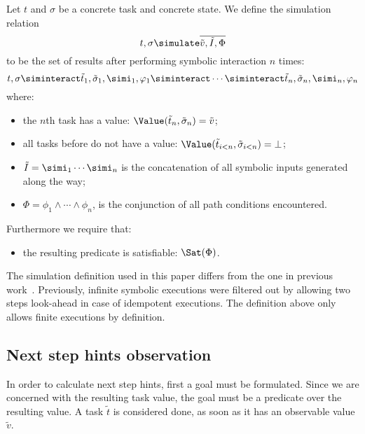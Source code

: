 \begin{definition}[Simulation]
  Let $t$ and $\sigma$ be a concrete task and concrete state.
  We define the simulation relation
  \begin{equation*}
    t,\sigma \simulate \overline{\tilde{v},\tilde{I},\Phi}
  \end{equation*}
  to be the set of results after performing symbolic interaction $n$ times:
  \begin{equation*}
      t,\sigma
        \siminteract \tilde{t}_1,\tilde{\sigma}_1,\simi_1,\phi_1
        \siminteract \cdots
        \siminteract \tilde{t}_n,\tilde{\sigma}_n,\simi_n,\phi_n
  \end{equation*}
  where:
  \begin{itemize}
    \item the $n$th task has a value: $\Value(\tilde{t}_n,\tilde{\sigma}_n) = \tilde{v}$;
    \item all tasks before do not have a value: $\Value(\tilde{t}_{i<n},\tilde{\sigma}_{i<n}) = \bot$;
    \item $\tilde{I} = \simi_1 \cdots \simi_n$ is the concatenation of all symbolic inputs generated along the way;
    \item $\Phi = \phi_1 \land \cdots \land \phi_n$, is the conjunction of all path conditions encountered.
  \end{itemize}
  Furthermore we require that:
  \begin{itemize}
    \item the resulting predicate is satisfiable: $\Sat(\Phi)$.
  \end{itemize}
\end{definition}

The simulation definition used in this paper differs from the one in previous work~\cite{Naus2019}.
Previously, infinite symbolic executions were filtered out by allowing two steps look-ahead in case of idempotent executions.
The definition above only allows finite executions by definition.



\subsection{Next step hints observation}
\label{sub:hints}


In order to calculate next step hints, first a goal must be formulated.
Since we are concerned with the resulting task value, the goal must be a predicate over the resulting value.
A task $\tilde{t}$ is considered done, as soon as it has an observable value $\tilde{v}$.


